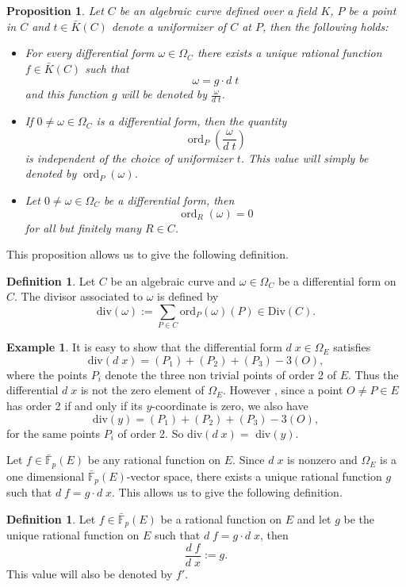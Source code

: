 \documentclass{article}
\numberwithin{equation}{section}
\newtheorem{proposition}[theorem]{Proposition}
\theoremstyle{definition}
\newtheorem{definition}[theorem]{Definition}
\newtheorem{example}[theorem]{Example}
\newcommand{\FFCL}[1]{{\bar {\mathbb F}}_{#1}} %
\begin{document}
\begin{proposition}
Let $C$ be an algebraic curve defined over a field $K$, $P$ be a point in $C$ and $t\in \bar{K}(C)$ denote a uniformizer of $C$ at $P$, then the following holds:
\begin{itemize}
\item For every differential form $\omega \in \Omega_C$ there exists a unique rational function $f \in \bar{K}(C)$ such that $$\omega=g\cdot d\;t$$ and this function $g$ will be denoted by $\frac{\omega}{d\;t}$.
\item If $0 \neq \omega \in \Omega_C$ is a differential form, then the quantity $$\operatorname{ord}_P(\frac{\omega}{d\;t})$$ is independent of the choice of uniformizer $t$. This value will simply be denoted by $\operatorname{ord}_P(\omega)$.
\item Let $0\neq \omega \in \Omega_C$ be a differential form, then $$\operatorname{ord}_R(\omega)=0$$ for all but finitely many $R\in C$.
\end{itemize}
\end{proposition}

This proposition allows us to give the following definition.

\begin{definition}
Let $C$ be an algebraic curve and $\omega \in \Omega_C$ be a differential form on $C$. The divisor associated to $\omega$ is defined by $$\text{div}(\omega):=\sum_{P \in C} \text{ord}_P(\omega)(P) \in \text{Div}(C).$$
\end{definition}

\begin{example}\label{dx/y}
It is easy to show that the differential form $d\;x\in\Omega_E$ satisfies $$\text{div}(d\;x)=(P_1)+(P_2)+(P_3)-3(O),$$ where the points $P_i$ denote the three non trivial points of order 2 of $E$. Thus the differential $d\;x$ is not the zero element of $\Omega_E$. However , since a point $O\neq P\in E$ has order 2 if and only if its $y$-coordinate is zero, we also have $$\text{div}(y)=(P_1)+(P_2)+(P_3)-3(O),$$ for the same points $P_i$ of order 2. So div$(d\;x)=$ div$(y)$.
\end{example}

Let $f\in \FFCL{p}(E)$ be any rational function on $E$. Since $d\;x$ is nonzero and $\Omega_E$ is a one dimensional $\FFCL{p}(E)$-vector space, there exists a unique rational function $g$ such that $d\;f=g\cdot d\;x$. This allows us to give the following definition.

\begin{definition}
Let $f\in\FFCL{p}(E)$ be a rational function on $E$ and let $g$ be the unique rational function on $E$ such that $d\;f=g\cdot d\;x$, then $$\frac{d\;f}{d\;x}:=g.$$ This value will also be denoted by $f'$.
\end{definition}
\end{document}

